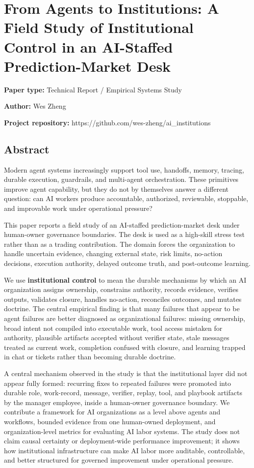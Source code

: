 \documentclass[
]{article}
\author{}
\date{}
\begin{document}
\section{From Agents to Institutions: A Field Study of Institutional Control in an AI-Staffed Prediction-Market Desk}\label{from-agents-to-institutions-a-field-study-of-institutional-control-in-an-ai-staffed-prediction-market-desk}

\textbf{Paper type:} Technical Report / Empirical Systems Study

\textbf{Author:} Wes Zheng

\textbf{Project repository:} https://github.com/wes-zheng/ai\_institutions

\subsection{Abstract}\label{abstract}

Modern agent systems increasingly support tool use, handoffs, memory, tracing, durable execution, guardrails, and multi-agent orchestration. These primitives improve agent capability, but they do not by themselves answer a different question: can AI workers produce accountable, authorized, reviewable, stoppable, and improvable work under operational pressure?

This paper reports a field study of an AI-staffed prediction-market desk under human-owner governance boundaries. The desk is used as a high-skill stress test rather than as a trading contribution. The domain forces the organization to handle uncertain evidence, changing external state, risk limits, no-action decisions, execution authority, delayed outcome truth, and post-outcome learning.

We use \textbf{institutional control} to mean the durable mechanisms by which an AI organization assigns ownership, constrains authority, records evidence, verifies outputs, validates closure, handles no-action, reconciles outcomes, and mutates doctrine. The central empirical finding is that many failures that appear to be agent failures are better diagnosed as organizational failures: missing ownership, broad intent not compiled into executable work, tool access mistaken for authority, plausible artifacts accepted without verifier state, stale messages treated as current work, completion confused with closure, and learning trapped in chat or tickets rather than becoming durable doctrine.

A central mechanism observed in the study is that the institutional layer did not appear fully formed: recurring fixes to repeated failures were promoted into durable role, work-record, message, verifier, replay, tool, and playbook artifacts by the manager employee, inside a human-owner governance boundary. We contribute a framework for AI organizations as a level above agents and workflows, bounded evidence from one human-owned deployment, and organization-level metrics for evaluating AI labor systems. The study does not claim causal certainty or deployment-wide performance improvement; it shows how institutional infrastructure can make AI labor more auditable, controllable, and better structured for governed improvement under operational pressure.
\end{document}
